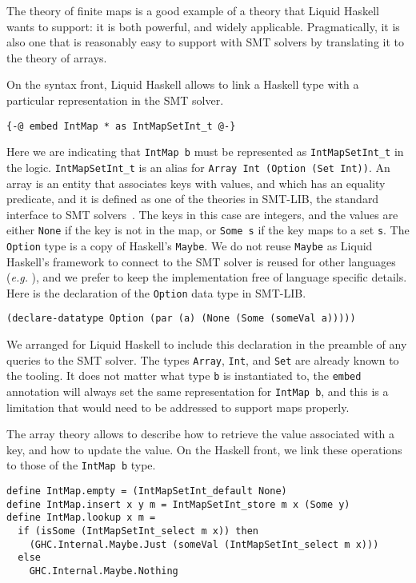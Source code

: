 \documentclass[sigconf]{acmart}
\newcommand{\tc}[1]{{\small\texttt{#1}}}
\begin{document}
The theory of finite maps is a good example of a theory that Liquid Haskell wants
to support: it is both powerful, and widely applicable. Pragmatically, it is also
one that is reasonably easy to support with SMT solvers by translating it to
the theory of arrays.

On the syntax front, Liquid Haskell allows to link a Haskell type with a particular
representation in the SMT solver.

\begin{verbatim}
{-@ embed IntMap * as IntMapSetInt_t @-}
\end{verbatim}

Here we are indicating that \tc{IntMap b} must be represented as \tc{IntMapSetInt\_t}
in the logic. \tc{IntMapSetInt\_t} is an alias for \tc{Array Int (Option (Set Int))}.
An array is an entity that associates keys with values, and which has an equality predicate,
and it is defined as one of the theories in SMT-LIB, the standard interface
to SMT solvers~\cite{BarFT-RR-25}.
The keys in this case are integers, and the values are either \tc{None} if the key
is not in the map, or \tc{Some s} if the key maps to a set \tc{s}. The
\tc{Option} type is a copy of Haskell's \tc{Maybe}.
We do not reuse \tc{Maybe} as Liquid Haskell's framework to connect to the SMT solver is
reused for other languages (\emph{e.g.} \cite{lehmann23}), and we prefer to keep
the implementation free of language specific details.
Here is the declaration of the \tc{Option} data type in SMT-LIB.

\begin{verbatim}
(declare-datatype Option (par (a) (None (Some (someVal a)))))
\end{verbatim}

We arranged for Liquid Haskell to include this declaration in the preamble of any
queries to the SMT solver. The types \tc{Array}, \tc{Int}, and \tc{Set} are already
known to the tooling.
It does not matter what type \tc{b} is instantiated to, the \tc{embed} annotation will
always set the same representation for \tc{IntMap b}, and this is a limitation that
would need to be addressed to support maps properly.

The array theory allows to describe how to retrieve the value associated with
a key, and how to update the value. On the Haskell front, we link these operations
to those of the \tc{IntMap b} type.

\begin{verbatim}
define IntMap.empty = (IntMapSetInt_default None)
define IntMap.insert x y m = IntMapSetInt_store m x (Some y)
define IntMap.lookup x m =
  if (isSome (IntMapSetInt_select m x)) then
    (GHC.Internal.Maybe.Just (someVal (IntMapSetInt_select m x)))
  else
    GHC.Internal.Maybe.Nothing
\end{verbatim}
\end{document}
